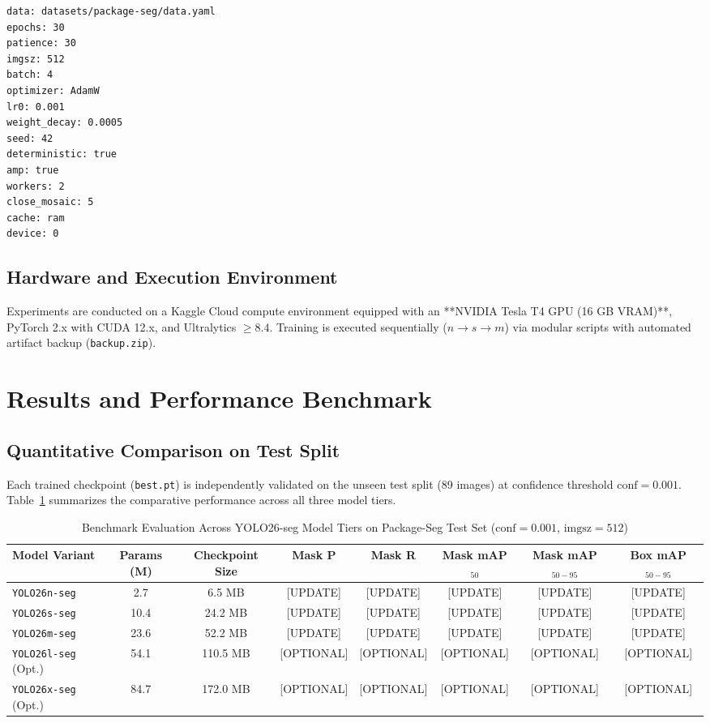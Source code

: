 \documentclass[conference]{IEEEtran}
\begin{document}
\begin{lstlisting}[language=bash, caption={Configuration file configs/train.yaml}]
data: datasets/package-seg/data.yaml
epochs: 30
patience: 30
imgsz: 512
batch: 4
optimizer: AdamW
lr0: 0.001
weight_decay: 0.0005
seed: 42
deterministic: true
amp: true
workers: 2
close_mosaic: 5
cache: ram
device: 0
\end{lstlisting}

\subsection{Hardware and Execution Environment}
Experiments are conducted on a Kaggle Cloud compute environment equipped with an **NVIDIA Tesla T4 GPU (16 GB VRAM)**, PyTorch 2.x with CUDA 12.x, and Ultralytics $\ge 8.4$. Training is executed sequentially ($n \rightarrow s \rightarrow m$) via modular scripts with automated artifact backup (\texttt{backup.zip}).

\section{Results and Performance Benchmark}

\subsection{Quantitative Comparison on Test Split}
Each trained checkpoint (\texttt{best.pt}) is independently validated on the unseen test split (89 images) at confidence threshold $\text{conf}=0.001$. Table~\ref{tab:results_comparison} summarizes the comparative performance across all three model tiers.

\begin{table}[htbp]
\caption{Benchmark Evaluation Across YOLO26-seg Model Tiers on Package-Seg Test Set ($\text{conf}=0.001$, $\text{imgsz}=512$)}
\label{tab:results_comparison}
\centering
\begin{tabular}{@{}lccccccc@{}}
\toprule
\textbf{Model Variant} & \textbf{Params (M)} & \textbf{Checkpoint Size} & \textbf{Mask P} & \textbf{Mask R} & \textbf{Mask mAP$_{50}$} & \textbf{Mask mAP$_{50-95}$} & \textbf{Box mAP$_{50-95}$} \\ \midrule
\texttt{YOLO26n-seg} & 2.7  & 6.5 MB  & [UPDATE] & [UPDATE] & [UPDATE] & [UPDATE] & [UPDATE] \\
\texttt{YOLO26s-seg} & 10.4 & 24.2 MB & [UPDATE] & [UPDATE] & [UPDATE] & [UPDATE] & [UPDATE] \\
\texttt{YOLO26m-seg} & 23.6 & 52.2 MB & [UPDATE] & [UPDATE] & [UPDATE] & [UPDATE] & [UPDATE] \\
\texttt{YOLO26l-seg} (Opt.) & 54.1 & 110.5 MB & [OPTIONAL] & [OPTIONAL] & [OPTIONAL] & [OPTIONAL] & [OPTIONAL] \\
\texttt{YOLO26x-seg} (Opt.) & 84.7 & 172.0 MB & [OPTIONAL] & [OPTIONAL] & [OPTIONAL] & [OPTIONAL] & [OPTIONAL] \\ \bottomrule
\end{tabular}
\end{table}
\end{document}

